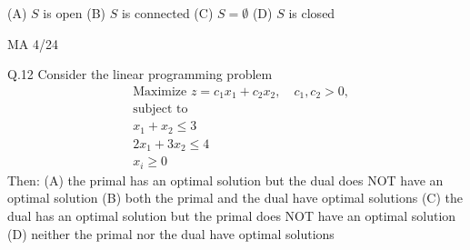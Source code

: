 \documentclass{article}
\begin{document}
																									\noindent (A) $S$ is open \hspace{5cm} (B) $S$ is connected
																									\newline \noindent (C) $S = \emptyset$ \hspace{5.5cm}  (D) $S$ is closed
																									\vspace{20em}
																									\begin{center}
																									    {MA 4/24}
																									    \end{center}
																									    \newpage
																									    Q.12 \quad Consider the linear programming problem
																									    \[
																									    \begin{aligned}
																									    & \text{Maximize } z = c_1 x_1 + c_2 x_2, \quad c_1, c_2 > 0, \\
																									    & \text{subject to} \\
																									    & x_1 + x_2 \le 3 \\
																									    & 2x_1 + 3x_2 \le 4 \\
																									    & x_i \ge 0
																									    \end{aligned}
																									    \]
																									    Then:
																									    \vspace{1em}
																									    \noindent \newline (A) the primal has an optimal solution but the dual does NOT have an optimal solution
																									    \noindent \newline (B) both the primal and the dual have optimal solutions
																									    \noindent \newline (C)  the dual has an optimal solution but the primal does NOT have an optimal solution
																									    \noindent \newline (D) neither the primal nor the dual have optimal solutions
																									    \vspace{1em}
\end{document}
